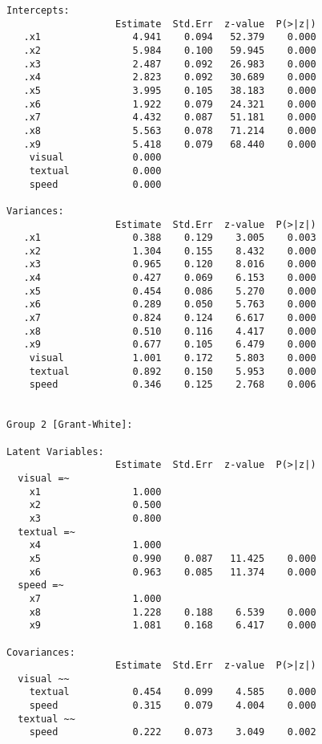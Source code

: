 \begin{verbatim}
Intercepts:
                   Estimate  Std.Err  z-value  P(>|z|)
   .x1                4.941    0.094   52.379    0.000
   .x2                5.984    0.100   59.945    0.000
   .x3                2.487    0.092   26.983    0.000
   .x4                2.823    0.092   30.689    0.000
   .x5                3.995    0.105   38.183    0.000
   .x6                1.922    0.079   24.321    0.000
   .x7                4.432    0.087   51.181    0.000
   .x8                5.563    0.078   71.214    0.000
   .x9                5.418    0.079   68.440    0.000
    visual            0.000                           
    textual           0.000                           
    speed             0.000                           

Variances:
                   Estimate  Std.Err  z-value  P(>|z|)
   .x1                0.388    0.129    3.005    0.003
   .x2                1.304    0.155    8.432    0.000
   .x3                0.965    0.120    8.016    0.000
   .x4                0.427    0.069    6.153    0.000
   .x5                0.454    0.086    5.270    0.000
   .x6                0.289    0.050    5.763    0.000
   .x7                0.824    0.124    6.617    0.000
   .x8                0.510    0.116    4.417    0.000
   .x9                0.677    0.105    6.479    0.000
    visual            1.001    0.172    5.803    0.000
    textual           0.892    0.150    5.953    0.000
    speed             0.346    0.125    2.768    0.006


Group 2 [Grant-White]:

Latent Variables:
                   Estimate  Std.Err  z-value  P(>|z|)
  visual =~                                           
    x1                1.000                           
    x2                0.500                           
    x3                0.800                           
  textual =~                                          
    x4                1.000                           
    x5                0.990    0.087   11.425    0.000
    x6                0.963    0.085   11.374    0.000
  speed =~                                            
    x7                1.000                           
    x8                1.228    0.188    6.539    0.000
    x9                1.081    0.168    6.417    0.000

Covariances:
                   Estimate  Std.Err  z-value  P(>|z|)
  visual ~~                                           
    textual           0.454    0.099    4.585    0.000
    speed             0.315    0.079    4.004    0.000
  textual ~~                                          
    speed             0.222    0.073    3.049    0.002


\end{verbatim}

